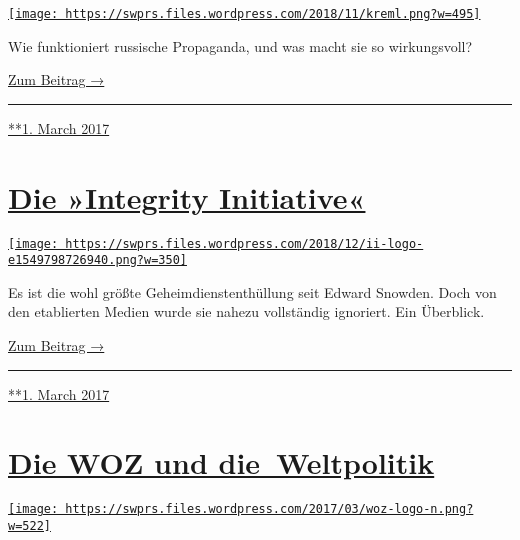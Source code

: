 \href{https://swprs.org/2017/03/01/russische-propaganda/}{\texttt{[image: https://swprs.files.wordpress.com/2018/11/kreml.png?w=495]}}

Wie funktioniert russische Propaganda, und was macht sie so
wirkungs­voll?

\href{https://swprs.org/russische-propaganda/}{Zum Beitrag →}

\begin{center}\rule{0.5\linewidth}{\linethickness}\end{center}

\href{https://swprs.org/2017/03/01/russische-propaganda/}{**1. March
2017}

\hypertarget{die-integrity-initiative}{%
\section{\texorpdfstring{\href{https://swprs.org/2017/03/01/die-integrity-initiative/}{Die
»Integrity
Initiative«}}{Die »Integrity Initiative«}}\label{die-integrity-initiative}}

\href{https://swprs.org/2017/03/01/die-integrity-initiative/}{\texttt{[image: https://swprs.files.wordpress.com/2018/12/ii-logo-e1549798726940.png?w=350]}}

Es ist die wohl größte Geheimdienstenthüllung seit Edward Snowden. Doch
von den etablierten Medien wurde sie nahezu vollständig ignoriert. Ein
Überblick.

\href{https://swprs.org/die-integrity-initiative/}{Zum Beitrag →}

\begin{center}\rule{0.5\linewidth}{\linethickness}\end{center}

\href{https://swprs.org/2017/03/01/die-integrity-initiative/}{**1. March
2017}

\hypertarget{die-woz-und-die-weltpolitik}{%
\section{\texorpdfstring{\href{https://swprs.org/2017/03/01/die-woz-und-die-weltpolitik/}{Die
WOZ und
die~Weltpolitik}}{Die WOZ und die~Weltpolitik}}\label{die-woz-und-die-weltpolitik}}

\href{https://swprs.org/2017/03/01/die-woz-und-die-weltpolitik/}{\texttt{[image: https://swprs.files.wordpress.com/2017/03/woz-logo-n.png?w=522]}}

